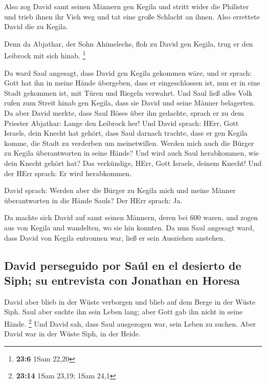  Also zog David samt seinen Männern gen Kegila und stritt
wider die Philister und trieb ihnen ihr Vieh weg und tat eine große
Schlacht an ihnen. Also errettete David die zu Kegila.

 Denn da Abjathar, der Sohn Ahimelechs, floh zu David gen
Kegila, trug er den Leibrock mit sich hinab. \footnote{\textbf{23:6}
  1Sam 22,20}

 Da ward Saul angesagt, dass David gen Kegila gekommen
wäre, und er sprach: Gott hat ihn in meine Hände übergeben, dass er
eingeschlossen ist, nun er in eine Stadt gekommen ist, mit Türen und
Riegeln verwahrt.  Und Saul ließ alles Volk rufen zum
Streit hinab gen Kegila, dass sie David und seine Männer belagerten.
 Da aber David merkte, dass Saul Böses über ihn gedachte,
sprach er zu dem Priester Abjathar: Lange den Leibrock her!
 Und David sprach: HErr, Gott Israels, dein Knecht hat
gehört, dass Saul darnach trachte, dass er gen Kegila komme, die Stadt
zu verderben um meinetwillen.  Werden mich auch die
Bürger zu Kegila überantworten in seine Hände? Und wird auch Saul
herabkommen, wie dein Knecht gehört hat? Das verkündige, HErr, Gott
Israels, deinem Knecht! Und der HErr sprach: Er wird herabkommen.

 David sprach: Werden aber die Bürger zu Kegila mich und
meine Männer überantworten in die Hände Sauls? Der HErr sprach: Ja.

 Da machte sich David auf samt seinen Männern, deren bei
600 waren, und zogen aus von Kegila und wandelten, wo sie hin konnten.
Da nun Saul angesagt ward, dass David von Kegila entronnen war, ließ er
sein Ausziehen anstehen.

\hypertarget{david-perseguido-por-sauxfal-en-el-desierto-de-siph-su-entrevista-con-jonathan-en-horesa}{%
\subsection{David perseguido por Saúl en el desierto de Siph; su
entrevista con Jonathan en
Horesa}\label{david-perseguido-por-sauxfal-en-el-desierto-de-siph-su-entrevista-con-jonathan-en-horesa}}

 David aber blieb in der Wüste verborgen und blieb auf
dem Berge in der Wüste Siph. Saul aber suchte ihn sein Leben lang; aber
Gott gab ihn nicht in seine Hände. \footnote{\textbf{23:14} 1Sam 23,19;
  1Sam 24,1}  Und David sah, dass Saul ausgezogen war,
sein Leben zu suchen. Aber David war in der Wüste Siph, in der Heide.

